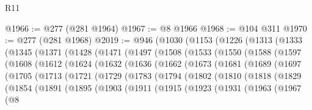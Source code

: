 \begin{lexlean}{R11}
\begin{coremodule}
@1966 := @277 (@281 @1964)
@1967 := @8 @1966
@1968 := @104 @311
@1970 := @277 (@281 @1968)
@2019 := @946
    (@1030
      (@1153
        (@1226
          (@1313
            (@1333
              (@1345
                (@1371
                  (@1428
                    (@1471
                      (@1497
                        (@1508
                          (@1533
                            (@1550
                              (@1588
                                (@1597
                                  (@1608
                                    (@1612
                                      (@1624
                                        (@1632
                                          (@1636
                                            (@1662
                                              (@1673
                                                (@1681
                                                  (@1689
                                                    (@1697
                                                      (@1705
                                                        (@1713
                                                          (@1721
                                                            (@1729
                                                              (@1783
                                                                (@1794
                                                                  (@1802
                                                                    (@1810
                                                                      (@1818
                                                                        (@1829
                                                                          (@1854
                                                                            (@1891
                                                                              (@1895
                                                                                (@1903
                                                                                  (@1911
                                                                                    (@1915
                                                                                      (@1923
                                                                                        (@1931
                                                                                          (@1963
                                                                                            (@1967
                                                                                              (@8

\end{coremodule}
\end{lexlean}
